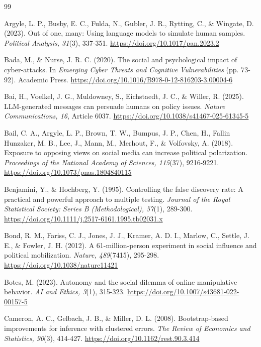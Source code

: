 \documentclass[11pt,a4paper]{article}
\newcommand{\doiurl}[1]{\href{https://doi.org/#1}{https://doi.org/#1}}
\begin{document}
\clearpage
\begin{thebibliography}{99}
\setlength{\itemsep}{0.45em}

Argyle, L. P., Busby, E. C., Fulda, N., Gubler, J. R., Rytting, C., \& Wingate, D. (2023). Out of
one, many: Using language models to simulate human samples. \textit{Political Analysis, 31}(3),
337-351. \doiurl{10.1017/pan.2023.2}

Bada, M., \& Nurse, J. R. C. (2020). The social and psychological impact of cyber-attacks. In
\textit{Emerging Cyber Threats and Cognitive Vulnerabilities} (pp. 73-92). Academic Press.
\doiurl{10.1016/B978-0-12-816203-3.00004-6}

Bai, H., Voelkel, J. G., Muldowney, S., Eichstaedt, J. C., \& Willer, R. (2025). LLM-generated
messages can persuade humans on policy issues. \textit{Nature Communications, 16}, Article 6037.
\doiurl{10.1038/s41467-025-61345-5}

Bail, C. A., Argyle, L. P., Brown, T. W., Bumpus, J. P., Chen, H., Fallin Hunzaker, M. B., Lee, J.,
Mann, M., Merhout, F., \& Volfovsky, A. (2018). Exposure to opposing views on social media can
increase political polarization. \textit{Proceedings of the National Academy of Sciences,
115}(37), 9216-9221. \doiurl{10.1073/pnas.1804840115}

Benjamini, Y., \& Hochberg, Y. (1995). Controlling the false discovery rate: A practical and
powerful approach to multiple testing. \textit{Journal of the Royal Statistical Society: Series B
(Methodological), 57}(1), 289-300. \doiurl{10.1111/j.2517-6161.1995.tb02031.x}

Bond, R. M., Fariss, C. J., Jones, J. J., Kramer, A. D. I., Marlow, C., Settle, J. E., \& Fowler,
J. H. (2012). A 61-million-person experiment in social influence and political mobilization.
\textit{Nature, 489}(7415), 295-298. \doiurl{10.1038/nature11421}

Botes, M. (2023). Autonomy and the social dilemma of online manipulative behavior. \textit{AI and
Ethics, 3}(1), 315-323. \doiurl{10.1007/s43681-022-00157-5}

Cameron, A. C., Gelbach, J. B., \& Miller, D. L. (2008). Bootstrap-based improvements for inference
with clustered errors. \textit{The Review of Economics and Statistics, 90}(3), 414-427.
\doiurl{10.1162/rest.90.3.414}


\end{thebibliography}
\end{document}
